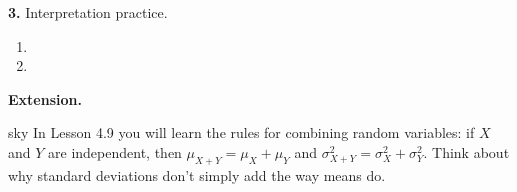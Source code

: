 \documentclass[10pt]{article}
\begin{document}
\begin{practicebox}
\vspace{0.14in}

\textbf{3.} Interpretation practice.

\begin{enumerate}[label=(\alph*), leftmargin=2em, itemsep=8pt]
  \item {}

  \item {}
\end{enumerate}

\end{practicebox}

\vspace{0.1in}

\begin{extensionbox}
\small
\textbf{Extension.}
\end{extensionbox}

\vspace{0.1in}

\begin{blurbbox}{sky}
\small
In Lesson 4.9 you will learn the rules for combining random variables: if $X$ and $Y$ are
independent, then $\mu_{X+Y} = \mu_X + \mu_Y$ and $\sigma^2_{X+Y} = \sigma^2_X + \sigma^2_Y$.
Think about why standard deviations don't simply add the way means do.
\end{blurbbox}
\end{document}
